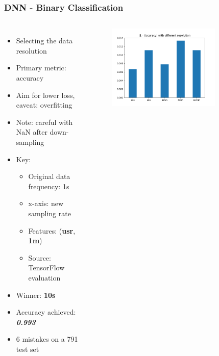 \documentclass[aspectratio=169,11pt,hyperref={colorlinks=true}]{beamer}
\begin{document}
\begin{frame}
    \frametitle{DNN - Binary Classification}
    \begin{columns}
        \begin{itemize}
            \item{Selecting the data resolution}
            \item{Primary metric: accuracy}
            \item{Aim for lower loss, caveat: overfitting}
            \item{Note: careful with NaN after down-sampling}
            \item{Key:}
            \begin{itemize}
              \item{Original data frequency: 1s}
              \item{x-axis: new sampling rate}
              \item{Features: (\textbf{usr}, \textbf{1m})}
              \item{Source: TensorFlow evaluation}
            \end{itemize}
            \item{Winner: \textbf{10s}}
            \item{Accuracy achieved: \emph{\textbf{0.993}}}
            \item{6 mistakes on a 791 test set}
        \end{itemize}
        \begin{center}
        \begin{figure}
          \includegraphics[width=0.8\textwidth,height=0.4\textheight]{graphs/accuracy_by_sampling-status.png}

\end{figure}
\end{center}
\end{columns}
\end{frame}
\end{document}
